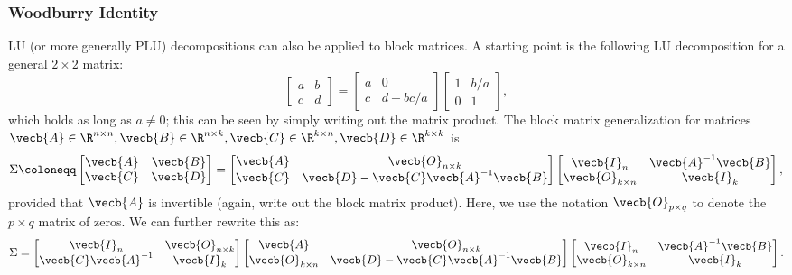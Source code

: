 \subsubsection{Woodburry Identity}
LU (or more generally PLU) decompositions can also be applied to block matrices. A starting point is the following LU decomposition for a general $2 \times 2$ matrix:
\begin{equation*}
	\begin{bmatrix}
		a & b \\
		c & d
	\end{bmatrix}
	=
	\begin{bmatrix}
		a & 0        \\
		c & d - bc/a
	\end{bmatrix}
	\begin{bmatrix}
		1 & b/a \\
		0 & 1
	\end{bmatrix},
\end{equation*}
which holds as long as $a \ne 0$; this can be seen by simply writing out the matrix product. The block matrix generalization for matrices $\vecb{A} \in \R^{n \times n}, \vecb{B} \in \R^{n \times k}, \vecb{C} \in \R^{k \times n}, \vecb{D} \in \R^{k \times k}$ is
\begin{equation} \label{eq:BlockLU}
	\Sigma \coloneqq \begin{bmatrix}
		\vecb{A} & \vecb{B} \\
		\vecb{C} & \vecb{D}
	\end{bmatrix}
	=
	\begin{bmatrix}
		\vecb{A} & \vecb{O}_{n \times k}                      \\
		\vecb{C} & \vecb{D} - \vecb{C} \vecb{A}^{-1} \vecb{B}
	\end{bmatrix}
	\begin{bmatrix}
		\vecb{I}_n            & \vecb{A}^{-1} \vecb{B} \\
		\vecb{O}_{k \times n} & \vecb{I}_k
	\end{bmatrix},
\end{equation}
provided that $\vecb{A}$ is invertible (again, write out the block matrix product). Here, we use the notation $\vecb{O}_{p \times q}$ to denote the $p \times q$ matrix of zeros. We can further rewrite this as:
\begin{equation*}
	\Sigma =
	\begin{bmatrix}
		\vecb{I}_n             & \vecb{O}_{n \times k} \\
		\vecb{C} \vecb{A}^{-1} & \vecb{I}_k
	\end{bmatrix}
	\begin{bmatrix}
		\vecb{A}              & \vecb{O}_{n \times k}                      \\
		\vecb{O}_{k \times n} & \vecb{D} - \vecb{C} \vecb{A}^{-1} \vecb{B}
	\end{bmatrix}
	\begin{bmatrix}
		\vecb{I}_n            & \vecb{A}^{-1} \vecb{B} \\
		\vecb{O}_{k \times n} & \vecb{I}_k
	\end{bmatrix}.
\end{equation*}
